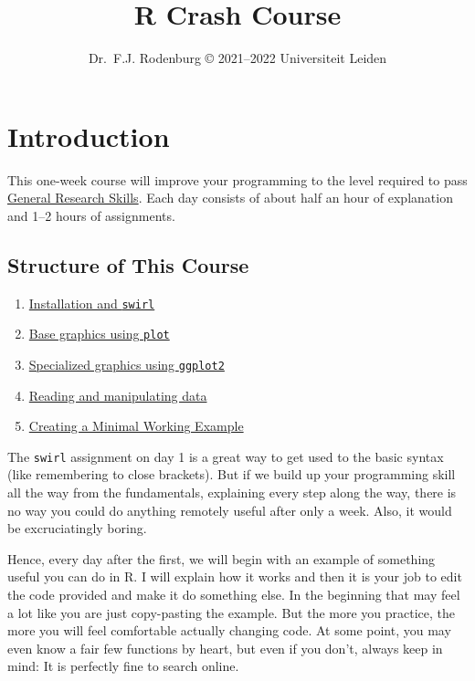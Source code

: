 \documentclass[
]{book}
\title{R Crash Course}
\author{Dr.~F.J. Rodenburg © 2021--2022 Universiteit Leiden}
\date{}
\providecommand{\tightlist}{%
  \setlength{\itemsep}{0pt}\setlength{\parskip}{0pt}}
\begin{document}
\maketitle

{
\setcounter{tocdepth}{1}
\tableofcontents
}
\hypertarget{introduction}{%
\chapter*{Introduction}\label{introduction}}

This one-week course will improve your programming to the level required to pass \href{https://fransrodenburg.github.io/General-Research-Skills/}{General Research Skills}. Each day consists of about half an hour of explanation and 1--2 hours of assignments.

\hypertarget{structure-of-this-course}{%
\section*{Structure of This Course}\label{structure-of-this-course}}

\begin{enumerate}
\def\labelenumi{\arabic{enumi}.}
\tightlist
\item
  \protect\hyperlink{installation}{Installation and \texttt{swirl}}
\item
  \protect\hyperlink{base-graphics}{Base graphics using \texttt{plot}}
\item
  \protect\hyperlink{ggplot2}{Specialized graphics using \texttt{ggplot2}}
\item
  \protect\hyperlink{data-manipulation}{Reading and manipulating data}
\item
  \protect\hyperlink{MWE}{Creating a Minimal Working Example}
\end{enumerate}

The \texttt{swirl} assignment on day 1 is a great way to get used to the basic syntax (like remembering to close brackets). But if we build up your programming skill all the way from the fundamentals, explaining every step along the way, there is no way you could do anything remotely useful after only a week. Also, it would be excruciatingly boring.

Hence, every day after the first, we will begin with an example of something useful you can do in R. I will explain how it works and then it is your job to edit the code provided and make it do something else. In the beginning that may feel a lot like you are just copy-pasting the example. But the more you practice, the more you will feel comfortable actually changing code. At some point, you may even know a fair few functions by heart, but even if you don't, always keep in mind: It is perfectly fine to search online.
\end{document}
